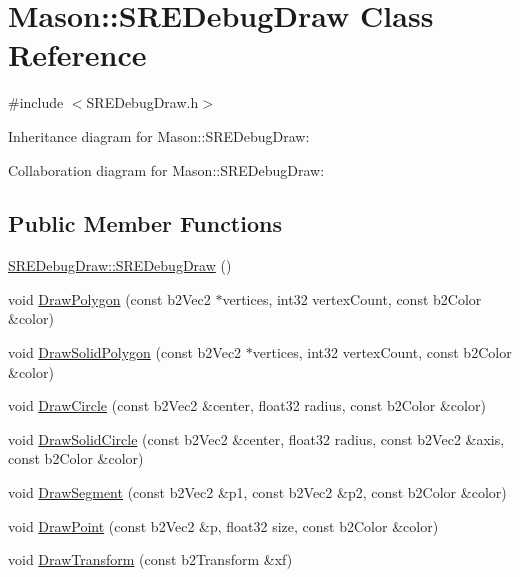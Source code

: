\hypertarget{class_mason_1_1_s_r_e_debug_draw}{}\section{Mason\+:\+:S\+R\+E\+Debug\+Draw Class Reference}
\label{class_mason_1_1_s_r_e_debug_draw}


{\ttfamily \#include $<$S\+R\+E\+Debug\+Draw.\+h$>$}



Inheritance diagram for Mason\+:\+:S\+R\+E\+Debug\+Draw\+:


Collaboration diagram for Mason\+:\+:S\+R\+E\+Debug\+Draw\+:
\subsection*{Public Member Functions}
\begin{DoxyCompactItemize}
\item 
\hyperlink{class_mason_1_1_s_r_e_debug_draw_ac95adf7a5ca2538a69cca69e694dbc58}{S\+R\+E\+Debug\+Draw\+::\+S\+R\+E\+Debug\+Draw} ()
\item 
void \hyperlink{class_mason_1_1_s_r_e_debug_draw_a3aeb14dc08bb5c4d490e30cc62ad1787}{Draw\+Polygon} (const b2\+Vec2 $\ast$vertices, int32 vertex\+Count, const b2\+Color \&color)
\item 
void \hyperlink{class_mason_1_1_s_r_e_debug_draw_af8308d695e1c6b61a2ba4226921c6b70}{Draw\+Solid\+Polygon} (const b2\+Vec2 $\ast$vertices, int32 vertex\+Count, const b2\+Color \&color)
\item 
void \hyperlink{class_mason_1_1_s_r_e_debug_draw_a6cb71e10d252900e6f469389146b9f48}{Draw\+Circle} (const b2\+Vec2 \&center, float32 radius, const b2\+Color \&color)
\item 
void \hyperlink{class_mason_1_1_s_r_e_debug_draw_a9392357bb882d28ca0a86f179901488b}{Draw\+Solid\+Circle} (const b2\+Vec2 \&center, float32 radius, const b2\+Vec2 \&axis, const b2\+Color \&color)
\item 
void \hyperlink{class_mason_1_1_s_r_e_debug_draw_ae52016e6134930d09f6f8a07308cc9e7}{Draw\+Segment} (const b2\+Vec2 \&p1, const b2\+Vec2 \&p2, const b2\+Color \&color)
\item 
void \hyperlink{class_mason_1_1_s_r_e_debug_draw_aaa826d0f196accca390c47023d28e2ce}{Draw\+Point} (const b2\+Vec2 \&p, float32 size, const b2\+Color \&color)
\item 
void \hyperlink{class_mason_1_1_s_r_e_debug_draw_a5255695e40bf3418a9f68e1405822aeb}{Draw\+Transform} (const b2\+Transform \&xf)
\end{DoxyCompactItemize}


